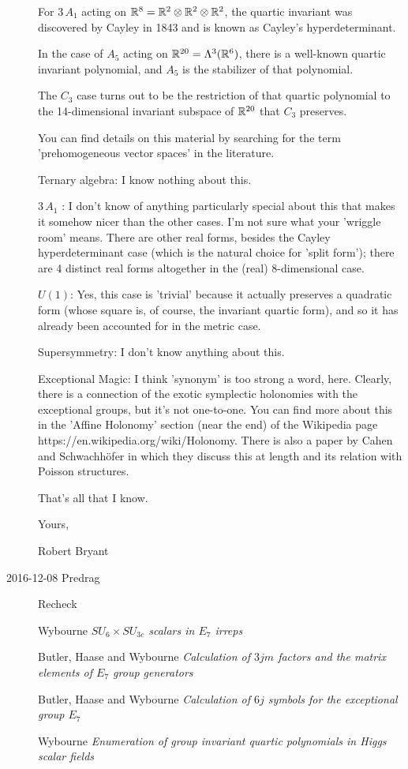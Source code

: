 \begin{description}
For $3\,A_1$ acting on $\mathbb{R}^8 = \mathbb{R}^2\otimes \mathbb{R}^2 \otimes \mathbb{R}^2$, the
        quartic invariant was discovered by Cayley in 1843 and is known as
        Cayley's hyperdeterminant.

In the case of $A_5$ acting on $\mathbb{R}^{20} =
        \Lambda^3(\mathbb{R}^6)$, there is a well-known quartic invariant polynomial,
        and $A_5$ is the stabilizer of that polynomial.

The $C_3$ case turns out
        to be the restriction of that quartic polynomial to the
        14-dimensional invariant subspace of $\mathbb{R}^{20}$ that $C_3$ preserves.

        You can find details on this material by searching for the term
        'prehomogeneous vector spaces' in the literature.

Ternary algebra:  I know nothing about this.

$3\,A_1$ :  I don't know of anything particularly special about this that makes it
somehow nicer than the other cases.  I'm not sure what your 'wriggle room'
means.  There are other real forms, besides the Cayley hyperdeterminant case
(which is the natural choice for 'split form'); there are 4 distinct real
forms altogether in the (real) 8-dimensional case.

$U(1)$:  Yes, this case is 'trivial' because it actually preserves a quadratic
form (whose square is, of course, the invariant quartic form), and so it has
already been accounted for in the metric case.

Supersymmetry:  I don't know anything about this.

Exceptional Magic:  I think 'synonym' is too strong a word, here.  Clearly,
there is a connection of the exotic symplectic holonomies with the
exceptional groups, but it's not one-to-one.  You can find more about this in
the 'Affine Holonomy' section (near the end) of the Wikipedia page
https://en.wikipedia.org/wiki/Holonomy.  There is also a paper by Cahen and
Schwachh{\"o}fer in which they discuss this at length and its
relation with Poisson structures.

        That's all that I know.

        Yours,

        Robert Bryant

\item[2016-12-08 Predrag] Recheck

Wybourne
{\em {$SU_6 \times SU_{3c}$} scalars in $E_7$ irreps}

Butler, Haase and Wybourne
{\em Calculation of {$3jm$} factors and the matrix elements of {$E_7$} group generators}

Butler, Haase and Wybourne
{\em Calculation of {$6j$} symbols for the exceptional group {$E_7$}}

Wybourne
{\em Enumeration of group invariant quartic polynomials in {Higgs} scalar fields}

\end{description}
\renewcommand{\ssp}{a}


\printbibliography[heading=subbibintoc,title={References}]
